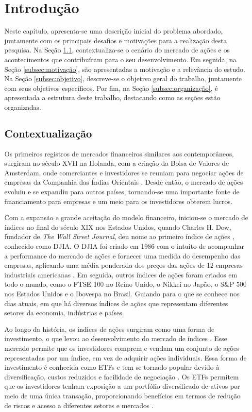 \chapter{Introdução}
\label{cap:introducao}
Neste capítulo, apresenta-se uma descrição inicial do problema abordado, juntamente com os principais desafios e motivações para a realização desta pesquisa. Na Seção \ref{subsec:contextualização}, contextualiza-se o cenário do mercado de ações e os acontecimentos que contribuíram para o seu desenvolvimento. Em seguida, na Seção \ref{subsec:motivação}, são apresentadas a motivação e a relevância do estudo. Na Seção \ref{subsec:objetivo}, descreve-se o objetivo geral do trabalho, juntamente com seus objetivos específicos. Por fim, na Seção \ref{subsec:organização}, é apresentada a estrutura deste trabalho, destacando como as seções estão organizadas.


\section{Contextualização}
\label{subsec:contextualização}
Os primeiros registros de mercados financeiros similares aos contemporâneos, surgiram no século XVII na Holanda, com a criação da Bolsa de Valores de Amsterdam, onde comerciantes e investidores se reuniam para negociar ações de empresas da Companhia das Índias Orientais \cite{french2006dutch}. Desde então, o mercado de ações evoluiu e se expandiu para outros países, tornando-se uma importante fonte de financiamento para empresas e um meio para os investidores obterem lucros.

Com a expansão e grande aceitação do modelo financeiro, iniciou-se o mercado de índices no final do século XIX nos Estados Unidos, quando Charles H. Dow, fundador de \textit{The Wall Street Journal}, deu nome ao primeiro índice de ações \cite{Richard1986}, conhecido como \ac{DJIA}. O \ac{DJIA} foi criado em 1986 com o intuito de acompanhar a performance do mercado de ações e fornecer uma medida do desempenho das empresas, aplicando uma média ponderada dos preços das ações de 12 empresas industriais americanas \cite{John_Dow}. 
Em seguida, outros índices de ações foram criados em todo o mundo, como o FTSE 100 no Reino Unido, o Nikkei no Japão, o S\&P 500 nos Estados Unidos e o Ibovespa no Brasil. Guiando para o que se conhece nos dias atuais, em que há diversos índices de ações que representam diferentes setores da economia, indústrias e países.

Ao longo da história, os índices de ações surgiram como uma forma de investimento, o que levou ao desenvolvimento do mercado de índices \cite{John2000}. Esse mercado permite que os investidores comprem e vendam um conjunto de ações representadas por um índice, em vez de adquirir ações individuais. Essa forma de investimento é conhecida como \ac{ETFs} e tem se tornado popular devido à diversificação, custos reduzidos e facilidade de negociação \cite{ben2017exchange}. Os \ac{ETFs} permitem que os investidores tenham exposição a um portfólio diversificado de ativos por meio de uma única transação, proporcionando benefícios em termos de redução de riscos e acesso a diferentes setores e mercados \cite{gad2019diversification}.

